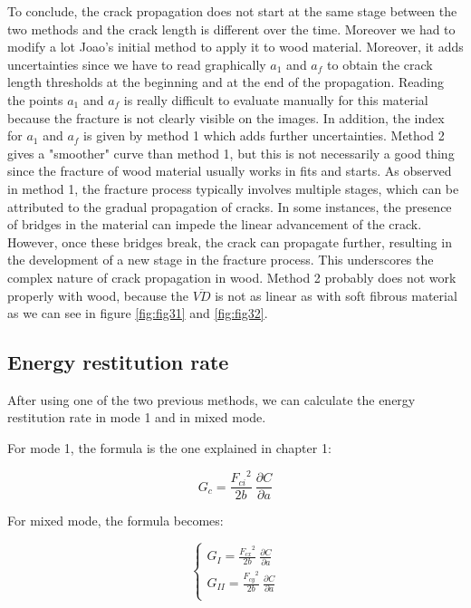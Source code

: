 To conclude, the crack propagation does not start at the same stage between the two methods and the crack length is different over the time. Moreover we had to modify a lot Joao's initial method to apply it to wood material. Moreover, it adds uncertainties since we have to read graphically $a_1$ and $a_f$ to obtain the crack length thresholds at the beginning and at the end of the propagation. Reading the points $a_1$ and $a_f$ is really difficult to evaluate manually for this material because the fracture is not clearly visible on the images. In addition, the index for $a_1$ and $a_f$ is given by method 1 which adds further uncertainties. Method 2 gives a "smoother" curve than method 1, but this is not necessarily a good thing since the fracture of wood material usually works in fits and starts.
As observed in method 1, the fracture process typically involves multiple stages, which can be attributed to the gradual propagation of cracks. In some instances, the presence of bridges in the material can impede the linear advancement of the crack. However, once these bridges break, the crack can propagate further, resulting in the development of a new stage in the fracture process. This underscores the complex nature of crack propagation in wood. Method 2 probably does not work properly with wood, because the $\overline{VD}$ is not as linear as with soft fibrous material  as we can see in figure \ref{fig:fig31} and \ref{fig:fig32}.

\subsection{Energy restitution rate}

After using one of the two previous methods, we can calculate the energy restitution rate in mode 1 and in mixed mode.

For mode 1, the formula is the one explained in chapter 1:

\begin{equation}
	G_c=\frac{{F_{ci}}^2}{2b}\ \frac{\partial C}{\partial a}
\end{equation}

For mixed mode, the formula becomes:

\begin{equation}
	\begin{cases}
		G_I=\frac{{F_{cx}}^2}{2b}\ \frac{\partial C}{\partial a} \\
		G_{II}=\frac{{F_{cy}}^2}{2b}\ \frac{\partial C}{\partial a}\\ 
	\end{cases}
\end{equation}

